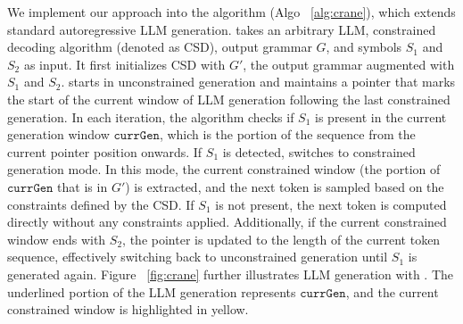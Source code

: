 We implement our approach into the \Tool algorithm (Algo ~\ref{alg:crane}), which extends standard autoregressive LLM generation. 
\Tool takes an arbitrary LLM, constrained decoding algorithm (denoted as CSD), output grammar $G$, and symbols $S_1$ and $S_2$ as input. It first initializes CSD with $G'$, the output grammar augmented with $S_1$ and $S_2$. \Tool starts in unconstrained generation and maintains a pointer that marks the start of the current window of LLM generation following the last constrained generation. In each iteration, the algorithm checks if $S_1$ is present in the current generation window $\texttt{currGen}$, which is the portion of the sequence from the current pointer position onwards.  If $S_1$ is detected, \Tool switches to constrained generation mode. In this mode, the current constrained window (the portion of $\texttt{currGen}$ that is in $G'$) is extracted, and the next token is sampled based on the constraints defined by the CSD. If $S_1$ is not present, the next token is computed directly without any constraints applied. Additionally, if the current constrained window ends with $S_2$, the pointer is updated to the length of the current token sequence, effectively switching back to unconstrained generation until $S_1$ is generated again. Figure ~\ref{fig:crane} further illustrates LLM generation with \Tool{}. The underlined portion of the LLM generation represents $\texttt{currGen}$, and the current constrained window is highlighted in yellow. 





